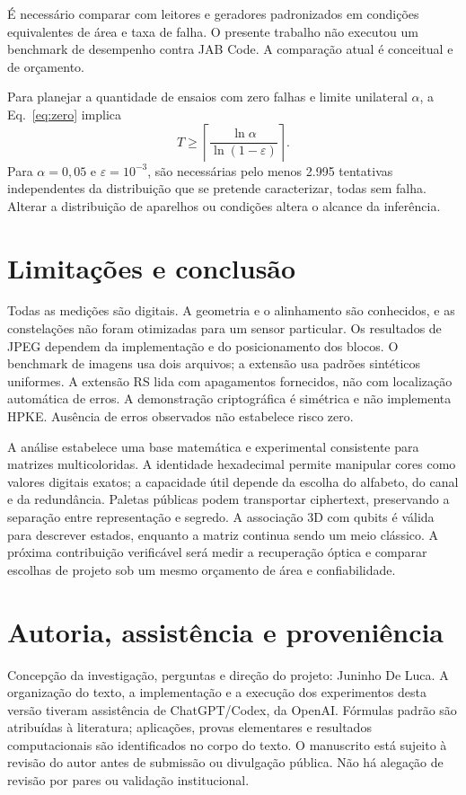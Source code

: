 \documentclass[11pt,a4paper]{article}
\begin{document}
É necessário comparar com leitores e geradores padronizados em condições equivalentes de área e taxa de falha. O presente trabalho não executou um benchmark de desempenho contra JAB Code. A comparação atual é conceitual e de orçamento.

Para planejar a quantidade de ensaios com zero falhas e limite unilateral $\alpha$, a Eq.~\eqref{eq:zero} implica
\begin{equation}
T\ge\left\lceil\frac{\ln\alpha}{\ln(1-\varepsilon)}\right\rceil.
\end{equation}
Para $\alpha=0,05$ e $\varepsilon=10^{-3}$, são necessárias pelo menos 2.995 tentativas independentes da distribuição que se pretende caracterizar, todas sem falha. Alterar a distribuição de aparelhos ou condições altera o alcance da inferência.

\section{Limitações e conclusão}
Todas as medições são digitais. A geometria e o alinhamento são conhecidos, e as constelações não foram otimizadas para um sensor particular. Os resultados de JPEG dependem da implementação e do posicionamento dos blocos. O benchmark de imagens usa dois arquivos; a extensão usa padrões sintéticos uniformes. A extensão RS lida com apagamentos fornecidos, não com localização automática de erros. A demonstração criptográfica é simétrica e não implementa HPKE. Ausência de erros observados não estabelece risco zero.

A análise estabelece uma base matemática e experimental consistente para matrizes multicoloridas. A identidade hexadecimal permite manipular cores como valores digitais exatos; a capacidade útil depende da escolha do alfabeto, do canal e da redundância. Paletas públicas podem transportar ciphertext, preservando a separação entre representação e segredo. A associação 3D com qubits é válida para descrever estados, enquanto a matriz continua sendo um meio clássico. A próxima contribuição verificável será medir a recuperação óptica e comparar escolhas de projeto sob um mesmo orçamento de área e confiabilidade.

\section*{Autoria, assistência e proveniência}
Concepção da investigação, perguntas e direção do projeto: Juninho De Luca. A organização do texto, a implementação e a execução dos experimentos desta versão tiveram assistência de ChatGPT/Codex, da OpenAI. Fórmulas padrão são atribuídas à literatura; aplicações, provas elementares e resultados computacionais são identificados no corpo do texto. O manuscrito está sujeito à revisão do autor antes de submissão ou divulgação pública. Não há alegação de revisão por pares ou validação institucional.
\end{document}
